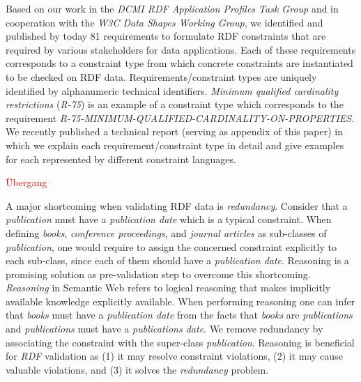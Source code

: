 \documentclass{acm_proc_article-sp}
\begin{document}
Based on our work in the \emph{DCMI RDF Application Profiles Task Group} and in cooperation with the \emph{W3C Data Shapes Working Group}, 
we identified and published by today 81 requirements to formulate RDF constraints that are required by various stakeholders for data applications.
Each of these requirements corresponds to a constraint type from which concrete constraints are instantiated to be checked on RDF data.
Requirements/constraint types are uniquely identified by alphanumeric technical identifiers.
\emph{Minimum qualified cardinality restrictions} (\emph{R-75}) is an example of a constraint type which corresponds to the requirement {\small\emph{R-75-MINIMUM-QUALIFIED-CARDINALITY-ON-PROPERTIES}}. 
We recently published a technical report \cite{BoschNolleAcarEckert2015}
(serving as appendix of this paper) 
in which we explain each requirement/constraint type in detail and give examples for each represented by different constraint languages.


\textcolor{red}{Übergang}

A major shortcoming when validating RDF data is \emph{redundancy}.
Consider that a \emph{publication} must have a \emph{publication date} which is a typical constraint.
When defining \emph{books}, \emph{conference proceedings}, and \emph{journal articles} as sub-classes of \emph{publication}, 
one would require to assign the concerned constraint explicitly to each sub-class, 
since each of them should have a \emph{publication date}.
Reasoning is a promising solution as pre-validation step to overcome this shortcoming. 
\emph{Reasoning} in Semantic Web refers to logical reasoning that  makes implicitly available knowledge explicitly available.
When performing reasoning one can infer that \emph{books} must have a \emph{publication date} 
from the facts that \emph{books} are \emph{publications} and \emph{publications} must have a \emph{publications date}.  
We remove redundancy by associating the constraint with the super-class \emph{publication}.
Reasoning is beneficial for \emph{RDF} validation as 
(1) it may resolve constraint violations, 
(2) it may cause valuable violations, and 
(3) it solves the \emph{redundancy} problem. 
\end{document}

